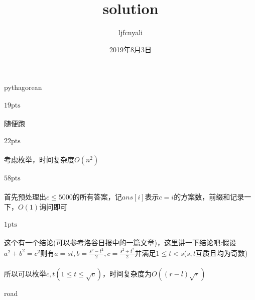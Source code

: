 \documentclass[UTF8]{ctexart}
\begin{document}
\title{solution}
\author{ljfcnyali}
\date{2019年8月3日}
\maketitle

\clearpage

\begin{center}
    \large{pythagorean}
\end{center}
\paragraph{$19\mathrm{pts}$}
\paragraph{}随便跑
\paragraph{$22\mathrm{pts}$}
\paragraph{}考虑枚举，时间复杂度$O(n^2)$
\paragraph{$58\mathrm{pts}$}
\paragraph{}首先预处理出$c\leq 5000$的所有答案，记$ans[i]$表示$c=i$的方案数，前缀和记录一下，$O(1)$询问即可
\paragraph{$1\mathrm{pts}$}
\paragraph{}这个有一个结论(可以参考洛谷日报中的一篇文章)，这里讲一下结论吧:假设$a^2+b^2=c^2$则有$a=st,b=\frac{s^2-t^2}{2},c=\frac{s^2+t^2}{2}$并满足$1\leq t<s$($s,t$互质且均为奇数)
\paragraph{}所以可以枚举$c,t(1\leq t\leq \sqrt{c})$，时间复杂度为$O((r-l)\sqrt{r})$

\clearpage

\begin{center}
    \large{road}
\end{center}
\end{document}
